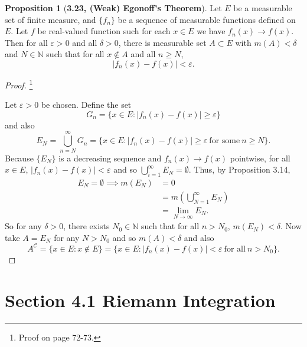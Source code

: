 \documentclass[12pt]{article}
\newcommand{\N}{\mathbb{N}}
\newcommand{\C}{\mathscr{C}}
\renewcommand{\epsilon}{\varepsilon}
\theoremstyle{definition}
\newtheorem*{prop}{Proposition}
\begin{document}
\begin{prop}[\textbf{3.23, (Weak) Egonoff's Theorem}]

    Let \( E \) be a measurable set of finite measure, and \( \{ f_n \} \) be a sequence of measurable functions defined on \( E \). Let \( f \) be real-valued function such for each \( x \in E \) we have \( f_n(x) \to f(x) \). Then for all \( \epsilon > 0 \) and all \( \delta > 0 \), there is measurable set \( A \subset E \) with \( m(A) < \delta \) and \( N \in \N \) such that for all \( x \not\in A \) and all \( n \geq N\),
        \[
            |f_n(x) - f(x)| < \epsilon.    
        \]

        \begin{proof}\footnote{Proof on page 72-73.}

            Let \( \epsilon > 0 \) be chosen. Define the set
                \[
                    G_n = \{ x \in E: |f_n(x) - f(x)| \geq \epsilon \}
                \]
            and also
                \[
                    E_N = \bigcup_{n=N}^{\infty} G_n = \{ x \in E: |f_n(x) - f(x)| \geq \epsilon \ \text{for some} \ n \geq N \}.
                \]  
            Because \( \{ E_N \} \) is a decreasing sequence and \( f_n(x) \to f(x)\) pointwise, for all \( x \in E \), \( |f_n(x) - f(x)| < \epsilon \) and so \( \displaystyle \bigcup_{i=1}^{\infty} E_N = \emptyset \). Thus, by Proposition 3.14,
                \begin{align*}
                    E_N = \emptyset \implies m(E_N) &= 0 \\
                                                    &= m \left( \bigcup_{N=1}^{\infty} E_N \right) \\
                                                    &= \lim_{N \to \infty} E_N.
                \end{align*}
            So for any \( \delta > 0 \), there exists \( N_0 \in \N \) such that for all \( n > N_0 \), \( m(E_N) < \delta \). Now take \( A = E_N \) for any \( N > N_0 \) and so \( m(A) < \delta \) and also 
                \[
                    A^{\C} = \{ x \in E: x \not\in E\} = \{ x \in E: |f_n(x) - f(x)| < \epsilon \ \text{for all} \ n > N_0 \}.
                \]
        \end{proof}

\section*{Section 4.1 Riemann Integration}


\end{prop}
\end{document}
